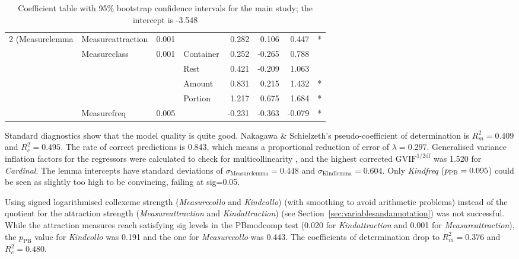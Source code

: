 \begin{table}
{\begin{tabular}{llrlrrrc}
    2 (Measurelemma & Measureattraction &  0.001                 &              &  0.282      &  0.106 &  0.447  & *             \\
                    & Measureclass      &  0.001                 & Container    &  0.252      & -0.265 &  0.788  &               \\
                    &                   &                        & Rest         &  0.421      & -0.209 &  1.063  &               \\
                    &                   &                        & Amount       &  0.831      &  0.215 &  1.432  & *             \\
                    &                   &                        & Portion      &  1.217      &  0.675 &  1.684  & *             \\
                    & Measurefreq       &  0.005                 &              & -0.231      & -0.363 & -0.079  & *             \\

  \end{tabular}
  }
  \caption{Coefficient table with 95\% bootstrap confidence intervals for the main study; the intercept is -3.548}
  \label{tab:bigtable}
\end{table}

Standard diagnostics show that the model quality is quite good.
Nakagawa \& Schielzeth's pseudo-coefficient of determination is $R_m^2=0.409$ and $R^2_c=0.495$.
The rate of correct predictions is 0.843, which means a proportional reduction of error of $\lambda=0.297$.
Generalised variance inflation factors for the regressors were calculated to check for multicollinearity \citep{FoxMonette1992,ZuurEa2010}, and the highest corrected $\text{GVIF}^{1/2\text{df}}$ was 1.520 for \textit{Cardinal}.
The lemma intercepts have standard deviations of $\sigma_{\text{Measurelemma}}=0.448$ and $\sigma_{\text{Kindlemma}}=0.604$.
Only \textit{Kindfreq} ($p_{\text{PB}}=0.095$) could be seen as slightly too high to be convincing, failing at sig=0.05.

Using signed logarithmised collexeme strength (\textit{Measurecollo} and \textit{Kindcollo}) (with smoothing to avoid arithmetic problems) instead of the quotient for the attraction strength (\textit{Measureattraction} and \textit{Kindattraction}) (see Section~\ref{sec:variablesandannotation}) was not successful.
While the attraction measures reach satisfying sig levels in the PBmodcomp test (0.020 for \textit{Kindattraction} and 0.001 for \textit{Measureattraction}), the $p_{\text{PB}}$ value for \textit{Kindcollo} was 0.191 and the one for \textit{Measurecollo} was 0.443.
The coefficients of determination drop to $R_m^2=0.376$ and $R^2_c=0.480$.

